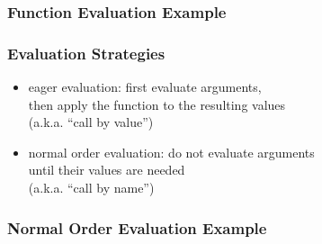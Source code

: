 \documentclass[dvipsnames]{beamer}
\theoremstyle{plain}
\begin{document}
\begin{frame}
  \frametitle{Function Evaluation Example}

  \begin{exampleblock}{}

    \pause
    \medskip

    \pause
    \medskip

    \pause
    \medskip

    \pause
    \medskip

    \pause
    \medskip

    \pause
    \medskip

    \pause
    \medskip
  \end{exampleblock}
\end{frame}

\begin{frame}
  \frametitle{Evaluation Strategies}

  \begin{itemize}
    \item \alert{eager evaluation}: first evaluate arguments,\\
      then apply the function to the resulting values\\
      (a.k.a. ``call by value'')

    \pause
    \medskip
    \item \alert{normal order evaluation}: do not evaluate arguments\\
      until their values are needed\\
      (a.k.a. ``call by name'')
  \end{itemize}
\end{frame}

\begin{frame}
  \frametitle{Normal Order Evaluation Example}

  \begin{exampleblock}{}

    \pause
    \medskip

    \pause
    \medskip

    \pause
    \medskip

    \pause
    \medskip

    \pause
    \medskip

    \pause
    \medskip

    \pause
    \medskip

    \pause
    \medskip
  \end{exampleblock}
\end{frame}
\end{document}
